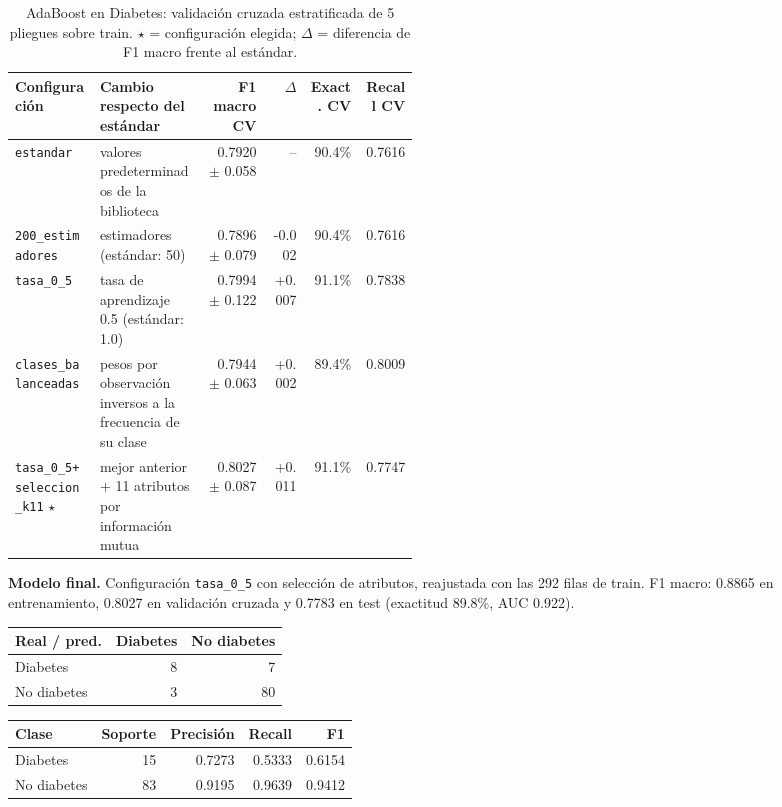 \documentclass[11pt]{article}
\begin{document}
\begin{table}[H]\centering\footnotesize
\caption{AdaBoost en Diabetes: validación cruzada estratificada de 5 pliegues sobre train. $\star$ = configuración elegida; $\Delta$ = diferencia de F1 macro frente al estándar.}
\begin{tabular}{>{\raggedright\arraybackslash}p{0.21\linewidth}>{\raggedright\arraybackslash}p{0.26\linewidth}rrrr}\toprule
Configuración & Cambio respecto del estándar & F1 macro CV & $\Delta$ & Exact. CV & Recall CV \\ \midrule
\texttt{estandar} & valores predeterminados de la biblioteca & 0.7920 $\pm$ 0.058 & -- & 90.4\% & 0.7616 \\
\texttt{200\_\allowbreak{}estimadores} & 200 estimadores (estándar: 50) & 0.7896 $\pm$ 0.079 & -0.002 & 90.4\% & 0.7616 \\
\texttt{tasa\_\allowbreak{}0\_\allowbreak{}5} & tasa de aprendizaje 0.5 (estándar: 1.0) & 0.7994 $\pm$ 0.122 & +0.007 & 91.1\% & 0.7838 \\
\texttt{clases\_\allowbreak{}balanceadas} & pesos por observación inversos a la frecuencia de su clase & 0.7944 $\pm$ 0.063 & +0.002 & 89.4\% & 0.8009 \\
\texttt{tasa\_\allowbreak{}0\_\allowbreak{}5+\allowbreak{}seleccion\_\allowbreak{}k11} $\star$ & mejor anterior + 11 atributos por información mutua & 0.8027 $\pm$ 0.087 & +0.011 & 91.1\% & 0.7747 \\
\bottomrule\end{tabular}
\end{table}

\textbf{Modelo final.} Configuración \texttt{tasa\_\allowbreak{}0\_\allowbreak{}5} con selección de atributos, reajustada con las 292 filas de train. F1 macro: 0.8865 en entrenamiento, 0.8027 en validación cruzada y 0.7783 en test (exactitud 89.8\%, AUC 0.922).

\begin{table}[H]\footnotesize\begin{minipage}[t]{0.44\linewidth}\centering{}\begin{tabular}{lrr}\toprule
Real / pred. & Diabetes & No diabetes \\ \midrule
Diabetes & 8 & 7 \\
No diabetes & 3 & 80 \\
\bottomrule\end{tabular}\end{minipage}\hfill\begin{minipage}[t]{0.52\linewidth}\centering{}\begin{tabular}{lrrrr}\toprule
Clase & Soporte & Precisión & Recall & F1 \\ \midrule
Diabetes & 15 & 0.7273 & 0.5333 & 0.6154 \\
No diabetes & 83 & 0.9195 & 0.9639 & 0.9412 \\
\bottomrule\end{tabular}\end{minipage}\end{table}
\end{document}
